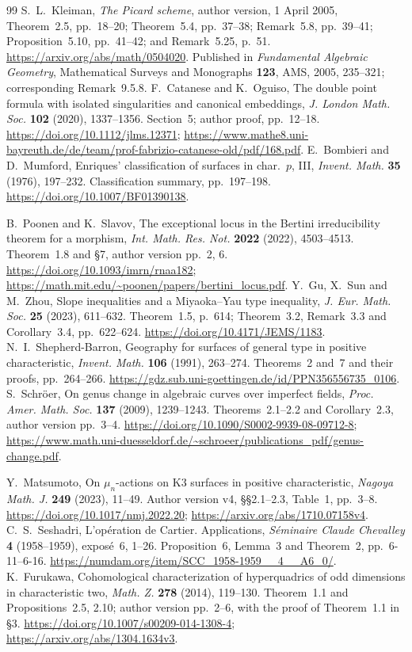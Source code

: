\documentclass[11pt]{article}
\theoremstyle{remark}\newtheorem{remark}[theorem]{Remark}
\begin{document}
\begin{thebibliography}{99}
S.~L.~Kleiman, \emph{The Picard scheme}, author version,
1 April 2005, Theorem~2.5, pp.~18--20; Theorem~5.4, pp.~37--38;
Remark~5.8, pp.~39--41; Proposition~5.10, pp.~41--42;
and Remark~5.25, p.~51.
\url{https://arxiv.org/abs/math/0504020}.
Published in \emph{Fundamental Algebraic Geometry},
Mathematical Surveys and Monographs \textbf{123}, AMS, 2005,
235--321; corresponding Remark~9.5.8.
F.~Catanese and K.~Oguiso, The double point formula with isolated
singularities and canonical embeddings,
\emph{J. London Math. Soc.} \textbf{102} (2020), 1337--1356.
Section~5; author proof, pp.~12--18.
\url{https://doi.org/10.1112/jlms.12371};
\url{https://www.mathe8.uni-bayreuth.de/de/team/prof-fabrizio-catanese-old/pdf/168.pdf}.
E.~Bombieri and D.~Mumford, Enriques' classification of surfaces
in char.~$p$, III, \emph{Invent. Math.} \textbf{35} (1976),
197--232. Classification summary, pp.~197--198.
\url{https://doi.org/10.1007/BF01390138}.


B.~Poonen and K.~Slavov, The exceptional locus in the Bertini
irreducibility theorem for a morphism, \emph{Int. Math. Res. Not.}
\textbf{2022} (2022), 4503--4513. Theorem~1.8 and \S7, author
version pp.~2, 6.
\url{https://doi.org/10.1093/imrn/rnaa182};
\url{https://math.mit.edu/~poonen/papers/bertini_locus.pdf}.
Y.~Gu, X.~Sun and M.~Zhou, Slope inequalities and a Miyaoka--Yau type
inequality, \emph{J. Eur. Math. Soc.} \textbf{25} (2023), 611--632.
Theorem~1.5, p.~614; Theorem~3.2, Remark~3.3 and Corollary~3.4,
pp.~622--624. \url{https://doi.org/10.4171/JEMS/1183}.
N.~I.~Shepherd-Barron, Geography for surfaces of general type in
positive characteristic, \emph{Invent. Math.} \textbf{106} (1991),
263--274. Theorems~2 and~7 and their proofs, pp.~264--266.
\url{https://gdz.sub.uni-goettingen.de/id/PPN356556735_0106}.
S.~Schr\"oer, On genus change in algebraic curves over imperfect
fields, \emph{Proc. Amer. Math. Soc.} \textbf{137} (2009), 1239--1243.
Theorems~2.1--2.2 and Corollary~2.3, author version pp.~3--4.
\url{https://doi.org/10.1090/S0002-9939-08-09712-8};
\url{https://www.math.uni-duesseldorf.de/~schroeer/publications_pdf/genus-change.pdf}.

 Y.~Matsumoto,
On $\mu_n$-actions on K3 surfaces in positive characteristic,
\emph{Nagoya Math. J.} \textbf{249} (2023), 11--49.
Author version v4, \S\S2.1--2.3, Table~1, pp.~3--8.
\url{https://doi.org/10.1017/nmj.2022.20};
\url{https://arxiv.org/abs/1710.07158v4}.
 C.~S.~Seshadri,
L'op\'eration de Cartier. Applications,
\emph{S\'eminaire Claude Chevalley} \textbf{4} (1958--1959),
expos\'e~6, 1--26. Proposition~6, Lemma~3 and Theorem~2,
pp.~6-11--6-16.
\url{https://numdam.org/item/SCC_1958-1959__4__A6_0/}.
 K.~Furukawa,
Cohomological characterization of hyperquadrics of odd dimensions
in characteristic two, \emph{Math. Z.} \textbf{278} (2014), 119--130.
Theorem~1.1 and Propositions~2.5, 2.10; author version pp.~2--6,
with the proof of Theorem~1.1 in \S3.
\url{https://doi.org/10.1007/s00209-014-1308-4};
\url{https://arxiv.org/abs/1304.1634v3}.



\end{thebibliography}
\end{document}
